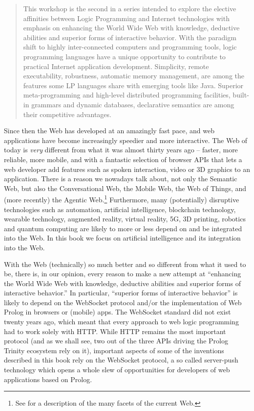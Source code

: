 \begin{quote}
This workshop is the second in a series intended to explore the elective affinities between Logic Programming and Internet technologies with emphasis on enhancing the World Wide Web with knowledge, deductive abilities and superior forms of interactive behavior. With the paradigm shift to highly inter-connected computers and programming tools, logic programming languages have a unique opportunity to contribute to practical Internet application development. Simplicity, remote executability, robustness, automatic memory management, are among the features some LP languages share with emerging tools like Java. Superior meta-programming and high-level distributed programming facilities, built-in grammars and dynamic databases, declarative semantics are among their competitive advantages.
\end{quote}

\noindent Since then the Web has developed at an amazingly fast pace, and web applications have become increasingly speedier and more interactive. The Web of today is \textit{very} different from what it was almost thirty years ago -- faster, more reliable, more mobile, and with a fantastic selection of browser APIs that lets a web developer add features such as spoken interaction, video or 3D graphics to an application. There is a reason we nowadays talk about, not only the Semantic Web, but also the Conversational Web, the Mobile Web, the Web of Things, and (more recently) the Agentic Web.\footnote{See \cite{lagermyrendal2012} for a description of the many facets of the current Web.} Furthermore, many (potentially) disruptive technologies such as automation, artificial intelligence, blockchain technology, wearable technology, augmented reality, virtual reality, 5G, 3D printing, robotics and quantum computing are likely to more or less depend on and be integrated into the Web. In this book we focus on artificial intelligence and its integration into the Web.

With the Web (technically) so much better and so different from what it used to be, there is, in our opinion, every reason to make a new attempt at ``enhancing the World Wide Web with knowledge, deductive abilities and superior forms of interactive behavior.'' In particular, ``superior forms of interactive behavior'' is likely to depend on the WebSocket protocol and/or the implementation of Web Prolog in browsers or (mobile) apps. The WebSocket standard did not exist twenty years ago, which meant that every approach to web logic programming had to work solely with HTTP. While HTTP remains the most important protocol (and as we shall see, two out of the three APIs driving the Prolog Trinity ecosystem rely on it), important aspects of some of the inventions described in this book rely on the WebSocket protocol, a so called server-push technology which opens a whole slew of opportunities for developers of web applications based on Prolog. 

